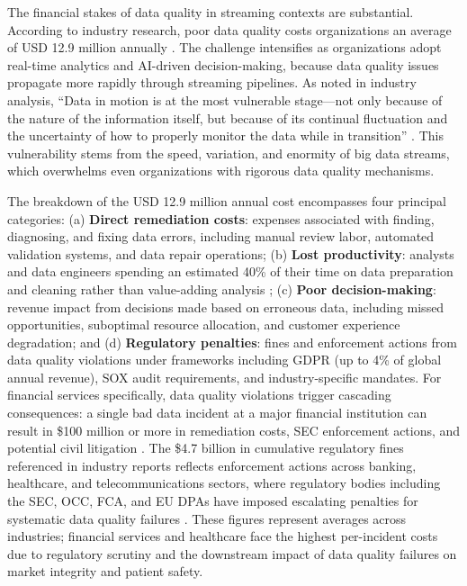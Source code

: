 The financial stakes of data quality in streaming contexts are substantial. According to industry research, poor data quality costs organizations an average of USD 12.9 million annually \citep{ibm_dq2024}. The challenge intensifies as organizations adopt real-time analytics and AI-driven decision-making, because data quality issues propagate more rapidly through streaming pipelines. As noted in industry analysis, ``Data in motion is at the most vulnerable stage—not only because of the nature of the information itself, but because of its continual fluctuation and the uncertainty of how to properly monitor the data while in transition'' \citep{precisely2024}. This vulnerability stems from the speed, variation, and enormity of big data streams, which overwhelms even organizations with rigorous data quality mechanisms.

The breakdown of the USD 12.9 million annual cost encompasses four principal categories: (a) \textbf{Direct remediation costs}: expenses associated with finding, diagnosing, and fixing data errors, including manual review labor, automated validation systems, and data repair operations; (b) \textbf{Lost productivity}: analysts and data engineers spending an estimated 40\% of their time on data preparation and cleaning rather than value-adding analysis \citep{ibm_dq2024}; (c) \textbf{Poor decision-making}: revenue impact from decisions made based on erroneous data, including missed opportunities, suboptimal resource allocation, and customer experience degradation; and (d) \textbf{Regulatory penalties}: fines and enforcement actions from data quality violations under frameworks including GDPR (up to 4\% of global annual revenue), SOX audit requirements, and industry-specific mandates. For financial services specifically, data quality violations trigger cascading consequences: a single bad data incident at a major financial institution can result in \$100 million or more in remediation costs, SEC enforcement actions, and potential civil litigation \citep{ibm_dq2024}. The \$4.7 billion in cumulative regulatory fines referenced in industry reports reflects enforcement actions across banking, healthcare, and telecommunications sectors, where regulatory bodies including the SEC, OCC, FCA, and EU DPAs have imposed escalating penalties for systematic data quality failures \citep{precisely2024}. These figures represent averages across industries; financial services and healthcare face the highest per-incident costs due to regulatory scrutiny and the downstream impact of data quality failures on market integrity and patient safety.

